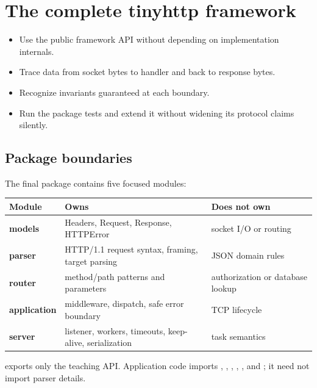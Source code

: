 \chapter{The complete tinyhttp framework}

\begin{objectives}
\begin{itemize}
  \item Use the public framework API without depending on implementation internals.
  \item Trace data from socket bytes to handler and back to response bytes.
  \item Recognize invariants guaranteed at each boundary.
  \item Run the package tests and extend it without widening its protocol claims silently.
\end{itemize}
\end{objectives}

\section{Package boundaries}

The final  package contains five focused modules:

\begin{center}
\begin{tabularx}{\textwidth}{@{}>{\bfseries}p{28mm} X X@{}}
\toprule
Module & Owns & Does not own \\
\midrule
models & Headers, Request, Response, HTTPError & socket I/O or routing \\
parser & HTTP/1.1 request syntax, framing, target parsing & JSON domain rules \\
router & method/path patterns and parameters & authorization or database lookup \\
application & middleware, dispatch, safe error boundary & TCP lifecycle \\
server & listener, workers, timeouts, keep-alive, serialization & task semantics \\
\bottomrule
\end{tabularx}
\end{center}

 exports only the teaching API. Application code
imports , , , ,
, and ; it need not import parser details.

